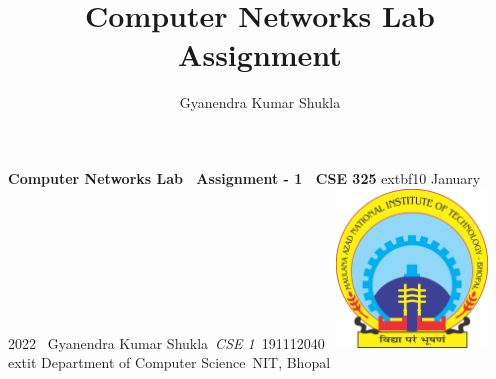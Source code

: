 \documentclass[14pt,a4paper]{article}
\author{Gyanendra Kumar Shukla}
\title{Computer Networks Lab Assignment}
\begin{document}
    \begin{titlepage}
    \centering
    \vfill
    {\bfseries\Huge
        Computer Networks Lab \
        Assignment - 1\
        \vskip0.5cm
        CSE 325
    }
    {\LARGE
        \vskip3cm
            extbf{10 January 2022}\
        \vskip3cm
        Gyanendra Kumar Shukla\
        \textit{CSE 1}\
        191112040\
    }    
    \vfill
    \vfill
    \includegraphics[width=4cm]{manitlogo.png} %
    \
    {	extit{
        Department of Computer Science\
        NIT, Bhopal\
    }}
    \vfill
    \vfill
\end{titlepage}
       \newpage
   
   
   
\tableofcontents

   
   \newpage

\end{document}
